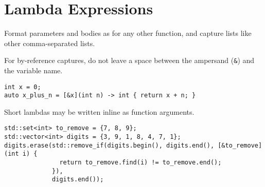 
\section{Lambda Expressions}\label{sec:lambda-expressions}
Format parameters and bodies as for any other function, and capture lists like other comma-separated lists.

For by-reference captures, do not leave a space between the ampersand (\texttt{&}) and the variable name.
\begin{verbatim}
int x = 0;
auto x_plus_n = [&x](int n) -> int { return x + n; }
\end{verbatim}
Short lambdas may be written inline as function arguments.
\begin{verbatim}
std::set<int> to_remove = {7, 8, 9};
std::vector<int> digits = {3, 9, 1, 8, 4, 7, 1};
digits.erase(std::remove_if(digits.begin(), digits.end(), [&to_remove](int i) {
               return to_remove.find(i) != to_remove.end();
             }),
             digits.end());
\end{verbatim}
